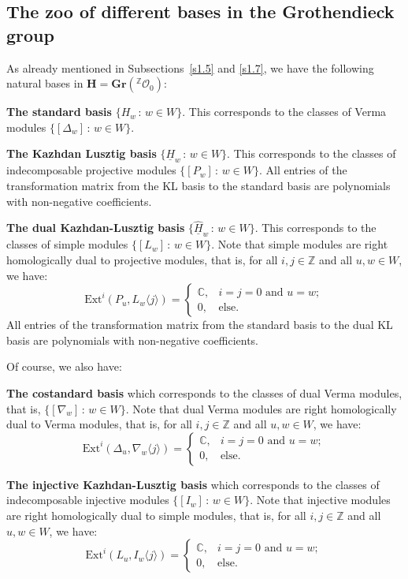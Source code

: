 \documentclass[a4paper]{amsart}
\begin{document}
\subsection{The zoo of different bases in the Grothendieck group}\label{s3.5}

As already mentioned in Subsections~\ref{s1.5} and \ref{s1.7}, we
have the following natural bases in 
$\mathbf{H}=\mathbf{Gr}({}^\mathbb{Z}\mathcal{O}_0)$:

{\bf The standard basis} $\{H_w\,:\,w\in W\}$. This corresponds
to the classes of Verma modules $\{[\Delta_w]\,:\,w\in W\}$.

{\bf The Kazhdan Lusztig basis} $\{\underline{H}_w\,:\,w\in W\}$. 
This corresponds to the classes of indecomposable projective 
modules $\{[P_w]\,:\,w\in W\}$. All entries of the transformation 
matrix from the KL basis to the standard basis are polynomials
with non-negative coefficients.

{\bf The dual Kazhdan-Lusztig basis} $\{\underline{\hat{H}}_w\,:\,w\in W\}$. 
This corresponds to the classes of simple modules $\{[L_w]\,:\,w\in W\}$.
Note that simple modules are right homologically dual to projective modules,
that is, for all $i,j\in\mathbb{Z}$ and all $u,w\in W$, we have:
\begin{displaymath}
\mathrm{Ext}^{i}(P_u,L_w\langle j\rangle) =
\begin{cases}
\mathbb{C},& i=j=0\text{ and }u=w;\\
0,& \text{else}. 
\end{cases}
\end{displaymath}
All entries of the transformation  matrix from the standard basis 
to the dual KL basis are polynomials
with non-negative coefficients.

Of course, we also have:

{\bf The costandard basis} which corresponds
to the classes of dual Verma modules, that is, $\{[\nabla_w]\,:\,w\in W\}$.
Note that dual Verma modules are right homologically dual to Verma modules,
that is, for all $i,j\in\mathbb{Z}$ and all $u,w\in W$, we have:
\begin{displaymath}
\mathrm{Ext}^{i}(\Delta_u,\nabla_w\langle j\rangle) =
\begin{cases}
\mathbb{C},& i=j=0\text{ and }u=w;\\
0,& \text{else}. 
\end{cases}
\end{displaymath}

{\bf The injective Kazhdan-Lusztig  basis} which corresponds
to the classes of indecomposable injective modules $\{[I_w]\,:\,w\in W\}$.
Note that injective modules are right homologically dual to simple modules,
that is, for all $i,j\in\mathbb{Z}$ and all $u,w\in W$, we have:
\begin{displaymath}
\mathrm{Ext}^{i}(L_u,I_w\langle j\rangle) =
\begin{cases}
\mathbb{C},& i=j=0\text{ and }u=w;\\
0,& \text{else}. 
\end{cases}
\end{displaymath}
\end{document}
